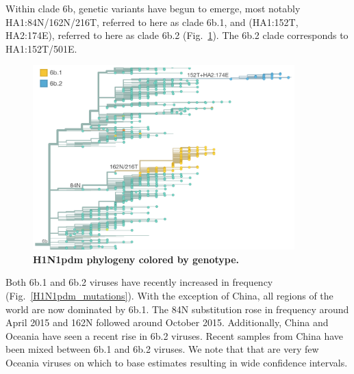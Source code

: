 \documentclass[11pt,oneside,letterpaper]{article}
\begin{document}
\pagebreak

Within clade 6b, genetic variants have begun to emerge, most notably HA1:84N/162N/216T, referred to here as clade 6b.1, and (HA1:152T, HA2:174E), referred to here as clade 6b.2 (Fig.\ \ref{H1N1pdm_tree}). The 6b.2 clade corresponds to HA1:152T/501E.

\begin{figure}[H]
	\centering		
	\includegraphics[width=0.9\textwidth]{../figures/feb-2016/H1N1pdm_tree.png}
	\caption{\textbf{H1N1pdm phylogeny colored by genotype.}
	}
	\label{H1N1pdm_tree}
\end{figure}

\pagebreak

Both 6b.1 and 6b.2 viruses have recently increased in frequency (Fig.\ \ref{H1N1pdm_mutations}). With the exception of China, all regions of the world are now dominated by 6b.1. The 84N substitution rose in frequency around April 2015 and 162N followed around October 2015. Additionally, China and Oceania have seen a recent rise in 6b.2 viruses. Recent samples from China have been mixed between 6b.1 and 6b.2 viruses. We note that that are very few Oceania viruses on which to base estimates resulting in wide confidence intervals.
\end{document}
